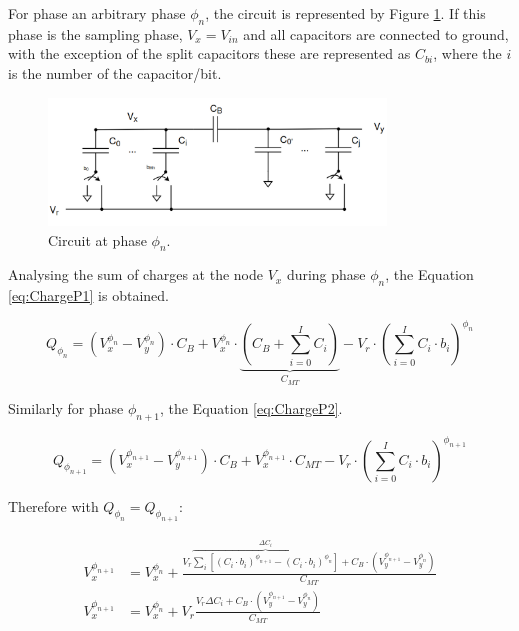 For phase an arbitrary phase $\phi_n$, the circuit is represented by Figure \ref{fig:P1_Circ}. If this phase is the sampling phase, $V_x = V_{in}$ and all capacitors are connected to ground, with the exception of the split capacitors these are represented as $C_{bi}$, where the $i$ is the number of the capacitor/bit.

\begin{figure}[H]

    \centering
    \includegraphics*[width=0.8\textwidth]{Images/DACCircPn.png}
    \caption{Circuit at phase $\phi_n$.}

    \label{fig:P1_Circ}
\end{figure}


Analysing the sum of charges at the node $V_x$ during phase $\phi_n$, the Equation \ref{eq:ChargeP1} is obtained.

\begin{equation}
    Q_{\phi_n} = (V_x^{\phi_n}-V_y^{\phi_n})\cdot C_B + V_x^{\phi_n}\cdot \underbrace{ \left ( C_B + \sum_{i=0}^{I}C_i \right )}_{C_{MT}}-V_r\cdot \left ( \sum_{i=0}^{I} C_i\cdot b_i \right )^{\phi_n}
    \label{eq:ChargeP1}
\end{equation}

Similarly for phase $\phi_{n+1}$, the Equation \ref{eq:ChargeP2}.

\begin{equation}
    Q_{\phi_{n+1}} = (V_x^{\phi_{n+1}}-V_y^{\phi_{n+1}})\cdot C_B + V_x^{\phi_{n+1}}\cdot C_{MT}-V_r\cdot \left ( \sum_{i=0}^{I} C_i\cdot b_i \right )^{\phi_{n+1}}
    \label{eq:ChargeP2}
\end{equation}

Therefore with $Q_{\phi_{n}}=Q_{\phi_{n+1}}$:

\begin{equation}
    \begin{split}
        V_x^{\phi_{n+1}} &= V_x^{\phi_{n}} +  \frac{ V_r\overbrace{\sum_{i}\left[ (C_i\cdot b_i)^{\phi_{n+1}} - (C_i\cdot b_i)^{\phi_{n}}\right]}^{\Delta C_i}+C_B\cdot \left(V_y^{\phi_{n+1}}-V_y^{\phi_{n}}\right)}{C_{MT}} \\
        V_x^{\phi_{n+1}} &= V_x^{\phi_{n}} + V_r \frac{ V_r \Delta C_i +C_B\cdot \left(V_y^{\phi_{n+1}}-V_y^{\phi_{n}}\right)}{C_{MT}}
    \end{split}
    \label{eq:VxPn}
\end{equation}

